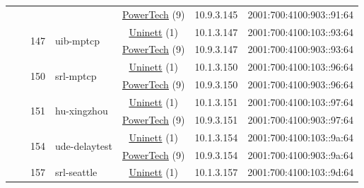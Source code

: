 \begin{small}
\begin{center}
\begin{longtable}{|c|c|c|c|c|c|c|c|}
  &  &  &  & \multicolumn{2}{|c|}{\tiny{\href{http://www.powertech.no}{PowerTech} (9)}} & \tiny{10.9.3.145} & \tiny{2001:700:4100:903::91:64} \\* \cline{3-3}\cline{4-4}\cline{5-5}\cline{6-6}\cline{7-7}\cline{8-8}
  &  & \multirow{2}{*}{\tiny{147}} & \multicolumn{1}{|l|}{\multirow{2}{*}{\tiny{uib-mptcp}}} & \multicolumn{2}{|c|}{\tiny{\href{https://www.uninett.no}{Uninett} (1)}} & \tiny{10.1.3.147} & \tiny{2001:700:4100:103::93:64} \\* \cline{5-5}\cline{6-6}\cline{7-7}\cline{8-8}
  &  &  &  & \multicolumn{2}{|c|}{\tiny{\href{http://www.powertech.no}{PowerTech} (9)}} & \tiny{10.9.3.147} & \tiny{2001:700:4100:903::93:64} \\* \cline{3-3}\cline{4-4}\cline{5-5}\cline{6-6}\cline{7-7}\cline{8-8}
  &  & \multirow{2}{*}{\tiny{150}} & \multicolumn{1}{|l|}{\multirow{2}{*}{\tiny{srl-mptcp}}} & \multicolumn{2}{|c|}{\tiny{\href{https://www.uninett.no}{Uninett} (1)}} & \tiny{10.1.3.150} & \tiny{2001:700:4100:103::96:64} \\* \cline{5-5}\cline{6-6}\cline{7-7}\cline{8-8}
  &  &  &  & \multicolumn{2}{|c|}{\tiny{\href{http://www.powertech.no}{PowerTech} (9)}} & \tiny{10.9.3.150} & \tiny{2001:700:4100:903::96:64} \\* \cline{3-3}\cline{4-4}\cline{5-5}\cline{6-6}\cline{7-7}\cline{8-8}
  &  & \multirow{2}{*}{\tiny{151}} & \multicolumn{1}{|l|}{\multirow{2}{*}{\tiny{hu-xingzhou}}} & \multicolumn{2}{|c|}{\tiny{\href{https://www.uninett.no}{Uninett} (1)}} & \tiny{10.1.3.151} & \tiny{2001:700:4100:103::97:64} \\* \cline{5-5}\cline{6-6}\cline{7-7}\cline{8-8}
  &  &  &  & \multicolumn{2}{|c|}{\tiny{\href{http://www.powertech.no}{PowerTech} (9)}} & \tiny{10.9.3.151} & \tiny{2001:700:4100:903::97:64} \\* \cline{3-3}\cline{4-4}\cline{5-5}\cline{6-6}\cline{7-7}\cline{8-8}
  &  & \multirow{2}{*}{\tiny{154}} & \multicolumn{1}{|l|}{\multirow{2}{*}{\tiny{ude-delaytest}}} & \multicolumn{2}{|c|}{\tiny{\href{https://www.uninett.no}{Uninett} (1)}} & \tiny{10.1.3.154} & \tiny{2001:700:4100:103::9a:64} \\* \cline{5-5}\cline{6-6}\cline{7-7}\cline{8-8}
  &  &  &  & \multicolumn{2}{|c|}{\tiny{\href{http://www.powertech.no}{PowerTech} (9)}} & \tiny{10.9.3.154} & \tiny{2001:700:4100:903::9a:64} \\* \cline{3-3}\cline{4-4}\cline{5-5}\cline{6-6}\cline{7-7}\cline{8-8}
  &  & \multirow{2}{*}{\tiny{157}} & \multicolumn{1}{|l|}{\multirow{2}{*}{\tiny{srl-seattle}}} & \multicolumn{2}{|c|}{\tiny{\href{https://www.uninett.no}{Uninett} (1)}} & \tiny{10.1.3.157} & \tiny{2001:700:4100:103::9d:64} \\* \cline{5-5}\cline{6-6}\cline{7-7}\cline{8-8}

\end{longtable}
\end{center}
\end{small}
